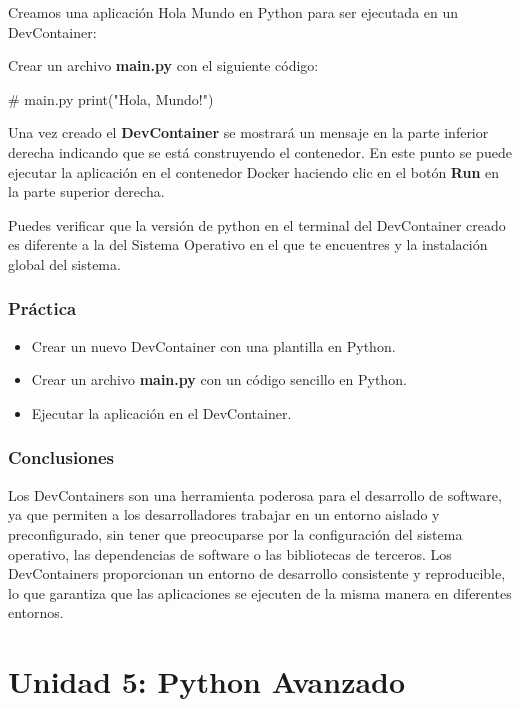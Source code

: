 \documentclass[
  a4paper,
  DIV=11,
  numbers=noendperiod,
  onepage,
  openany]{scrreprt}
\newenvironment{Shaded}{\begin{snugshade}}{\end{snugshade}}
\newcommand{\BuiltInTok}[1]{\textcolor[rgb]{0.00,0.23,0.31}{#1}}
\newcommand{\CommentTok}[1]{\textcolor[rgb]{0.37,0.37,0.37}{#1}}
\newcommand{\NormalTok}[1]{\textcolor[rgb]{0.00,0.23,0.31}{#1}}
\newcommand{\StringTok}[1]{\textcolor[rgb]{0.13,0.47,0.30}{#1}}
\begin{document}
Creamos una aplicación Hola Mundo en Python para ser ejecutada en un
DevContainer:

Crear un archivo \textbf{main.py} con el siguiente código:

\begin{Shaded}
\begin{Highlighting}[]
\CommentTok{\# main.py}
\BuiltInTok{print}\NormalTok{(}\StringTok{"Hola, Mundo!"}\NormalTok{)}
\end{Highlighting}
\end{Shaded}

Una vez creado el \textbf{DevContainer} se mostrará un mensaje en la
parte inferior derecha indicando que se está construyendo el contenedor.
En este punto se puede ejecutar la aplicación en el contenedor Docker
haciendo clic en el botón \textbf{Run} en la parte superior derecha.

Puedes verificar que la versión de python en el terminal del
DevContainer creado es diferente a la del Sistema Operativo en el que te
encuentres y la instalación global del sistema.

\section{Práctica}\label{pruxe1ctica-2}

\begin{itemize}
\item
  Crear un nuevo DevContainer con una plantilla en Python.
\item
  Crear un archivo \textbf{main.py} con un código sencillo en Python.
\item
  Ejecutar la aplicación en el DevContainer.
\end{itemize}

\section{Conclusiones}\label{conclusiones-6}

Los DevContainers son una herramienta poderosa para el desarrollo de
software, ya que permiten a los desarrolladores trabajar en un entorno
aislado y preconfigurado, sin tener que preocuparse por la configuración
del sistema operativo, las dependencias de software o las bibliotecas de
terceros. Los DevContainers proporcionan un entorno de desarrollo
consistente y reproducible, lo que garantiza que las aplicaciones se
ejecuten de la misma manera en diferentes entornos.

\part{Unidad 5: Python Avanzado}
\end{document}
